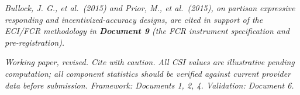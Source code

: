 \documentclass[
]{article}
\begin{document}
\emph{Bullock, J. G., et al.~(2015) and Prior, M., et al.~(2015), on
partisan expressive responding and incentivized-accuracy designs, are
cited in support of the ECI/FCR methodology in \textbf{Document 9} (the
FCR instrument specification and pre-registration).}

\emph{Working paper, revised. Cite with caution. All CSI values are
illustrative pending computation; all component statistics should be
verified against current provider data before submission. Framework:
Documents 1, 2, 4. Validation: Document 6.}
\end{document}
